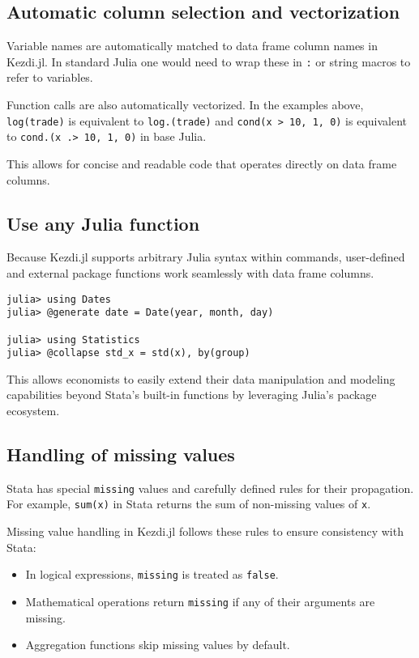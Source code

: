 \documentclass{juliacon}
\begin{document}
\subsection{Automatic column selection and vectorization}

Variable names are automatically matched to data frame column names in Kezdi.jl. In standard Julia one would need to wrap these in \texttt{:} or string macros to refer to variables.

Function calls are also automatically vectorized. In the examples above, \texttt{log(trade)} is equivalent to \texttt{log.(trade)} and \texttt{cond(x > 10, 1, 0)} is equivalent to \texttt{cond.(x .> 10, 1, 0)} in base Julia.

This allows for concise and readable code that operates directly on data frame columns.

\subsection{Use any Julia function}

Because Kezdi.jl supports arbitrary Julia syntax within commands, user-defined and external package functions work seamlessly with data frame columns.

\begin{verbatim}
julia> using Dates
julia> @generate date = Date(year, month, day)

julia> using Statistics
julia> @collapse std_x = std(x), by(group) 
\end{verbatim}

This allows economists to easily extend their data manipulation and modeling capabilities beyond Stata's built-in functions by leveraging Julia's package ecosystem.

\subsection{Handling of missing values}

Stata has special \texttt{missing} values and carefully defined rules for their propagation. For example, \texttt{sum(x)} in Stata returns the sum of non-missing values of \texttt{x}.

Missing value handling in Kezdi.jl follows these rules to ensure consistency with Stata:

\begin{itemize}
	\item In logical expressions, \texttt{missing} is treated as \texttt{false}.
	\item Mathematical operations return \texttt{missing} if any of their arguments are missing.
	\item Aggregation functions skip missing values by default.
\end{itemize}
\end{document}

